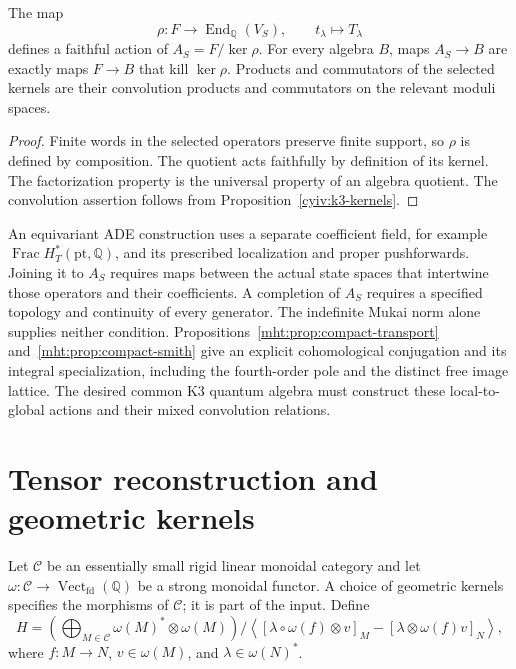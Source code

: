 \begin{proposition}\label{cyiv:k3-action}
The map
\[
 \rho:F\longrightarrow\operatorname{End}_{\mathbb Q}(V_S),
 \qquad t_\lambda\longmapsto T_\lambda
\]
defines a faithful action of $A_S=F/\ker\rho$.
For every algebra $B$, maps $A_S\to B$ are exactly maps $F\to B$
that kill $\ker\rho$.
Products and commutators of the selected kernels are their convolution
products and commutators on the relevant moduli spaces.
\end{proposition}
\begin{proof}
Finite words in the selected operators preserve finite support, so
$\rho$ is defined by composition.
The quotient acts faithfully by definition of its kernel.
The factorization property is the universal property of an algebra
quotient.
The convolution assertion follows from Proposition~\ref{cyiv:k3-kernels}.
\end{proof}

An equivariant ADE construction uses a separate coefficient field,
for example $\operatorname{Frac}H_T^*(\mathrm{pt},\mathbb Q)$,
and its prescribed localization and proper pushforwards.
Joining it to $A_S$ requires maps between the actual state spaces that
intertwine those operators and their coefficients.
A completion of $A_S$ requires a specified topology and continuity of
every generator.
The indefinite Mukai norm alone supplies neither condition.
Propositions~\ref{mht:prop:compact-transport} and~\ref{mht:prop:compact-smith} give an explicit cohomological conjugation and its integral specialization, including the fourth-order pole and the distinct free image lattice.
The desired common K3 quantum algebra must construct these local-to-global
actions and their mixed convolution relations.

\chapter{Tensor reconstruction and geometric kernels}
Let $\mathscr C$ be an essentially small rigid linear monoidal category
and let $\omega:\mathscr C\to\operatorname{Vect}_{\mathrm{fd}}(\mathbb Q)$
be a strong monoidal functor.
A choice of geometric kernels specifies the morphisms of $\mathscr C$;
it is part of the input.
Define
\[
 H=\left(\bigoplus_{M\in\mathscr C}\omega(M)^*\otimes\omega(M)\right)
 \big/\left\langle
 [\lambda\circ\omega(f)\otimes v]_M
 -[\lambda\otimes\omega(f)v]_N\right\rangle,
\]
where $f:M\to N$, $v\in\omega(M)$, and $\lambda\in\omega(N)^*$.

